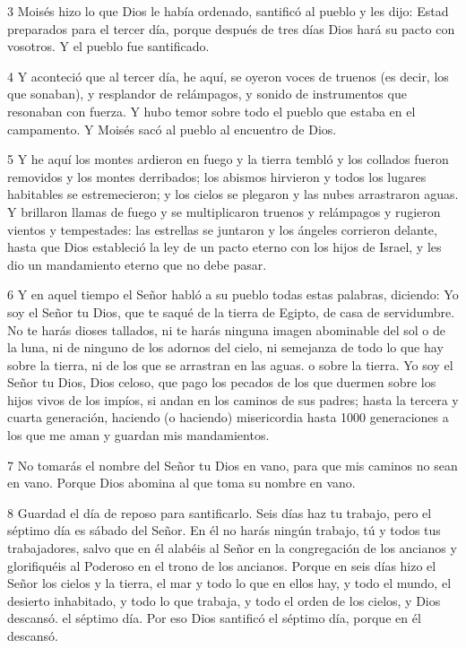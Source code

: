 \par 3 Moisés hizo lo que Dios le había ordenado, santificó al pueblo y les dijo: Estad preparados para el tercer día, porque después de tres días Dios hará su pacto con vosotros. Y el pueblo fue santificado.

\par 4 Y aconteció que al tercer día, he aquí, se oyeron voces de truenos (es decir, los que sonaban), y resplandor de relámpagos, y sonido de instrumentos que resonaban con fuerza. Y hubo temor sobre todo el pueblo que estaba en el campamento. Y Moisés sacó al pueblo al encuentro de Dios.

\par 5 Y he aquí los montes ardieron en fuego y la tierra tembló y los collados fueron removidos y los montes derribados; los abismos hirvieron y todos los lugares habitables se estremecieron; y los cielos se plegaron y las nubes arrastraron aguas. Y brillaron llamas de fuego y se multiplicaron truenos y relámpagos y rugieron vientos y tempestades: las estrellas se juntaron y los ángeles corrieron delante, hasta que Dios estableció la ley de un pacto eterno con los hijos de Israel, y les dio un mandamiento eterno que no debe pasar.

\par 6 Y en aquel tiempo el Señor habló a su pueblo todas estas palabras, diciendo: Yo soy el Señor tu Dios, que te saqué de la tierra de Egipto, de casa de servidumbre. No te harás dioses tallados, ni te harás ninguna imagen abominable del sol o de la luna, ni de ninguno de los adornos del cielo, ni semejanza de todo lo que hay sobre la tierra, ni de los que se arrastran en las aguas. o sobre la tierra. Yo soy el Señor tu Dios, Dios celoso, que pago los pecados de los que duermen sobre los hijos vivos de los impíos, si andan en los caminos de sus padres; hasta la tercera y cuarta generación, haciendo (o haciendo) misericordia hasta 1000 generaciones a los que me aman y guardan mis mandamientos.

\par 7 No tomarás el nombre del Señor tu Dios en vano, para que mis caminos no sean en vano. Porque Dios abomina al que toma su nombre en vano.

\par 8 Guardad el día de reposo para santificarlo. Seis días haz tu trabajo, pero el séptimo día es sábado del Señor. En él no harás ningún trabajo, tú y todos tus trabajadores, salvo que en él alabéis al Señor en la congregación de los ancianos y glorifiquéis al Poderoso en el trono de los ancianos. Porque en seis días hizo el Señor los cielos y la tierra, el mar y todo lo que en ellos hay, y todo el mundo, el desierto inhabitado, y todo lo que trabaja, y todo el orden de los cielos, y Dios descansó. el séptimo día. Por eso Dios santificó el séptimo día, porque en él descansó.

